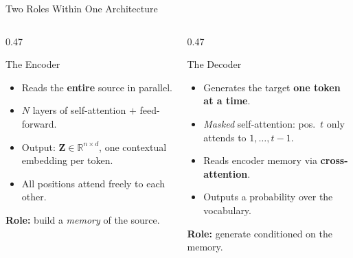 \documentclass[aspectratio=169]{beamer}
\begin{document}
%
%
\begin{frame}{Two Roles Within One Architecture}
\vspace{-1mm}
\begin{columns}[T]
  \begin{column}{0.47\textwidth}
    \begin{block}{The Encoder}
      \begin{itemize}\setlength\itemsep{0pt}\small
        \item Reads the \textbf{entire} source in parallel.
        \item $N$ layers of self-attention $+$ feed-forward.
        \item Output: $\mathbf{Z}\in\mathbb{R}^{n\times d}$, one
              contextual embedding per token.
        \item All positions attend freely to each other.
      \end{itemize}
      \vspace{2pt}\small\textbf{Role:} build a \emph{memory} of the source.
    \end{block}
  \end{column}

  \begin{column}{0.47\textwidth}
    \begin{block}{The Decoder}
      \begin{itemize}\setlength\itemsep{0pt}\small
        \item Generates the target \textbf{one token at a time}.
        \item \emph{Masked} self-attention: pos.\ $t$ only attends
              to $1,\ldots,t{-}1$.
        \item Reads encoder memory via \textbf{cross-attention}.
        \item Outputs a probability over the vocabulary.
      \end{itemize}
      \vspace{2pt}\small\textbf{Role:} generate conditioned on the memory.
    \end{block}
  \end{column}
\end{columns}


\end{frame}
\end{document}
